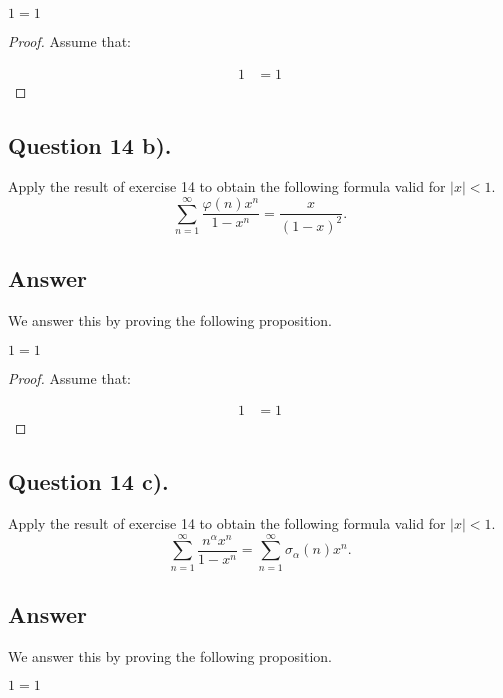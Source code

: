 \begin{proposition}
    $1=1$
\end{proposition}

\begin{proof}
    Assume that:

    \begin{align*}
        1 &= 1
    \end{align*}

\end{proof}


\subsection{Question 14 b).}
\noindent
Apply the result of exercise 14 to obtain the following formula valid for $|x|<1$.
\[
    \sum_{n=1}^{\infty} \frac{\varphi(n) x^n}{1-x^n} = \frac{x}{(1-x)^2}.
\]

\subsection*{Answer}
\noindent
We answer this by proving the following proposition.

\begin{proposition}
    $1=1$
\end{proposition}

\begin{proof}
    Assume that:

    \begin{align*}
        1 &= 1
    \end{align*}

\end{proof}


\subsection{Question 14 c).}
\noindent
Apply the result of exercise 14 to obtain the following formula valid for $|x|<1$.
\[
    \sum_{n=1}^{\infty} \frac{n^\alpha x^n}{1-x^n} = \sum_{n=1}^{\infty} \sigma_{\alpha}(n)x^n.
\]

\subsection*{Answer}
\noindent
We answer this by proving the following proposition.

\begin{proposition}
    $1=1$
\end{proposition}

